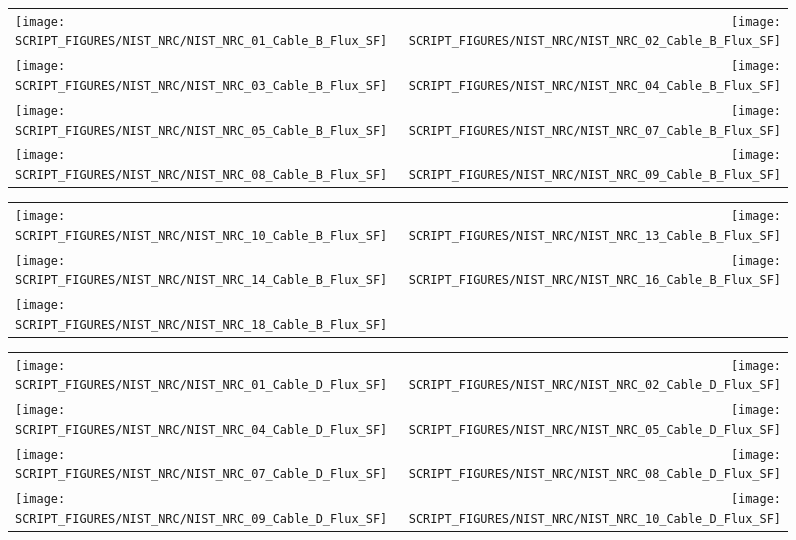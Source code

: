 \clearpage

\begin{figure}[p]
\begin{tabular*}{\textwidth}{l@{\extracolsep{\fill}}r}
\texttt{[image: SCRIPT\_FIGURES/NIST\_NRC/NIST\_NRC\_01\_Cable\_B\_Flux\_SF]} &
\texttt{[image: SCRIPT\_FIGURES/NIST\_NRC/NIST\_NRC\_02\_Cable\_B\_Flux\_SF]} \\
\texttt{[image: SCRIPT\_FIGURES/NIST\_NRC/NIST\_NRC\_03\_Cable\_B\_Flux\_SF]} &
\texttt{[image: SCRIPT\_FIGURES/NIST\_NRC/NIST\_NRC\_04\_Cable\_B\_Flux\_SF]} \\
\texttt{[image: SCRIPT\_FIGURES/NIST\_NRC/NIST\_NRC\_05\_Cable\_B\_Flux\_SF]} &
\texttt{[image: SCRIPT\_FIGURES/NIST\_NRC/NIST\_NRC\_07\_Cable\_B\_Flux\_SF]} \\
\texttt{[image: SCRIPT\_FIGURES/NIST\_NRC/NIST\_NRC\_08\_Cable\_B\_Flux\_SF]} &
\texttt{[image: SCRIPT\_FIGURES/NIST\_NRC/NIST\_NRC\_09\_Cable\_B\_Flux\_SF]}
\end{tabular*}
\end{figure}

\begin{figure}[p]
\begin{tabular*}{\textwidth}{l@{\extracolsep{\fill}}r}
\texttt{[image: SCRIPT\_FIGURES/NIST\_NRC/NIST\_NRC\_10\_Cable\_B\_Flux\_SF]} &
\texttt{[image: SCRIPT\_FIGURES/NIST\_NRC/NIST\_NRC\_13\_Cable\_B\_Flux\_SF]} \\
\texttt{[image: SCRIPT\_FIGURES/NIST\_NRC/NIST\_NRC\_14\_Cable\_B\_Flux\_SF]} &
\texttt{[image: SCRIPT\_FIGURES/NIST\_NRC/NIST\_NRC\_16\_Cable\_B\_Flux\_SF]} \\
\texttt{[image: SCRIPT\_FIGURES/NIST\_NRC/NIST\_NRC\_18\_Cable\_B\_Flux\_SF]}
\end{tabular*}
\end{figure}

\begin{figure}[p]
\begin{tabular*}{\textwidth}{l@{\extracolsep{\fill}}r}
\texttt{[image: SCRIPT\_FIGURES/NIST\_NRC/NIST\_NRC\_01\_Cable\_D\_Flux\_SF]} &
\texttt{[image: SCRIPT\_FIGURES/NIST\_NRC/NIST\_NRC\_02\_Cable\_D\_Flux\_SF]} \\
\texttt{[image: SCRIPT\_FIGURES/NIST\_NRC/NIST\_NRC\_04\_Cable\_D\_Flux\_SF]} &
\texttt{[image: SCRIPT\_FIGURES/NIST\_NRC/NIST\_NRC\_05\_Cable\_D\_Flux\_SF]} \\
\texttt{[image: SCRIPT\_FIGURES/NIST\_NRC/NIST\_NRC\_07\_Cable\_D\_Flux\_SF]} &
\texttt{[image: SCRIPT\_FIGURES/NIST\_NRC/NIST\_NRC\_08\_Cable\_D\_Flux\_SF]} \\
\texttt{[image: SCRIPT\_FIGURES/NIST\_NRC/NIST\_NRC\_09\_Cable\_D\_Flux\_SF]} &
\texttt{[image: SCRIPT\_FIGURES/NIST\_NRC/NIST\_NRC\_10\_Cable\_D\_Flux\_SF]}
\end{tabular*}
\end{figure}


